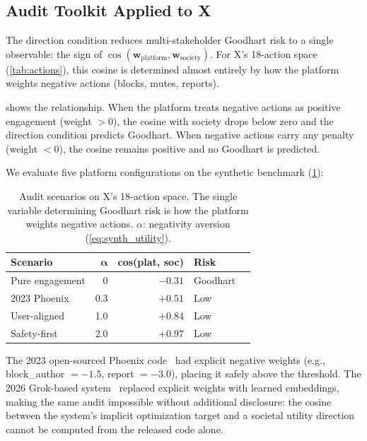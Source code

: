 \documentclass[11pt,letterpaper]{article}
\begin{document}
\subsection{Audit Toolkit Applied to X}
\label{sec:audit}

The direction condition reduces multi-stakeholder Goodhart risk to
a single observable: the sign of
$\cos(\mathbf{w}_{\text{platform}}, \mathbf{w}_{\text{society}})$.
For X's 18-action space (\cref{tab:actions}), this cosine is
determined almost entirely by how the platform weights negative
actions (blocks, mutes, reports).

 shows the relationship. When the platform treats
negative actions as positive engagement (weight $> 0$), the
cosine with society drops below zero and the direction condition
predicts Goodhart. When negative actions carry any penalty (weight
$< 0$), the cosine remains positive and no Goodhart is predicted.

We evaluate five platform configurations on the synthetic
benchmark (\cref{tab:scenarios}):

\begin{table}[t]
  \caption{Audit scenarios on X's 18-action space. The single
    variable determining Goodhart risk is how the platform weights
    negative actions. $\alpha$: negativity aversion
    (\cref{eq:synth_utility}).}
  \label{tab:scenarios}
  \centering\small
  \begin{tabular}{lrrll}
    \toprule
    \textbf{Scenario} & $\boldsymbol{\alpha}$ &
      \textbf{cos(plat, soc)} & \textbf{Risk} \\
    \midrule
    Pure engagement     & 0 & $-0.31$ & Goodhart \\
    2023 Phoenix        & 0.3 & $+0.51$ & Low \\
    User-aligned        & 1.0 & $+0.84$ & Low \\
    Safety-first        & 2.0 & $+0.97$ & Low \\
    \bottomrule
  \end{tabular}
\end{table}

The 2023 open-sourced Phoenix code~\cite{xalgorithm2023} had
explicit negative weights (e.g., block\_author $= -1.5$, report
$= -3.0$), placing it safely above the threshold. The 2026
Grok-based system~\cite{xalgorithm2026} replaced explicit weights
with learned embeddings, making the same audit impossible without
additional disclosure: the cosine between the system's implicit
optimization target and a societal utility direction cannot be
computed from the released code alone.
\end{document}
